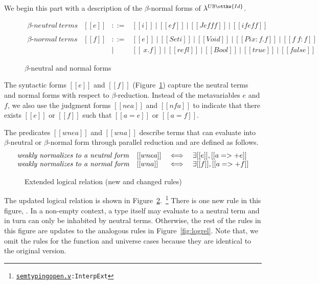 \documentclass[acmsmall,screen=true,
\ifpublic review=false\else,review=true\fi
  ,anonymous=\ifanonymous true\else false\fi]{acmart}
\newcommand{\dotv}[2]{\href{#1}{\texttt{#1}}{\texttt{:#2}}}
\newcommand{\lang}{$\lambda^{U\mathbb{B}\ottkw{Id}}$\xspace}
\newcommand{\scw}[1]{}
\begin{document}
We begin this part with a description of the $\beta$-normal forms
of \lang{}.

\begin{figure}[h]
  \[
    \begin{array}{llcl}
       \beta\text{-}\mathit{neutral\ terms} &
      [[e]] & ::= & [[i]]\ |\ [[e f]]\ |\ [[J e f f f]]\ |\ [[if e f
                    f]] \\ \\
      \beta\text{-}\mathit{normal\ terms} &
      [[f]] & ::= & [[e]]\ |\ [[Set i]]\ |\ [[Void]]\ |\ [[Pi x : f . f]]\
                    |\ [[f ~ f : f]]\\
            & & |   & [[\ x . f]]\ |\ [[refl]]\ |\ [[Bool]]\ |\ [[true]]\ |\ [[false]]
    \end{array}
  \]
  \caption{$\beta$-neutral and normal forms}
  \label{fig:nenf}
\end{figure}

The syntactic forms $[[e]]$ and $[[f]]$ (Figure~\ref{fig:nenf}) capture the
neutral terms and normal forms with respect to $\beta$-reduction\scw{Why not say parallel reduction here? We can be specific and say that that the only reductions available for these terms are identity reductions and cite
\footnote{\dotv{normalform.v}{nf\_refl}} }. Instead of the
metavariables $e$ and $f$, we also
use the judgment forms $[[ne a]]$ and $[[nf a]]$ to indicate that there exists
$[[e]]$ or $[[f]]$ such that $[[a = e]]$ or $[[a = f]]$.

The predicates $[[wne a]]$ and $[[wn
a]]$ describe terms that can evaluate into $\beta$-neutral or
$\beta$-normal form through parallel reduction and are defined as
follows.
\[
\begin{array}{llcl}
\mbox{\emph{weakly normalizes to a neutral form}} & [[wne a]] &\iff& \exists [[e]], [[a =>+ e]] \\
\mbox{\emph{weakly normalizes to a normal form}}  & [[wn a]]  &\iff& \exists [[f]], [[a =>+ f]] \\
\end{array}
\]

\begin{figure}[h]
  \caption{Extended logical relation (new and changed rules) }
  \label{fig:logrelopen}
\end{figure}

The updated logical relation is shown in
Figure~\ref{fig:logrelopen}.~\footnote{\dotv{semtypingopen.v}{InterpExt}}
There is one new rule in this figure, \rref{I-Ne}. In a non-empty context, a
type itself may evaluate to a neutral term and in turn can only be inhabited
by neutral terms.  Otherwise, the rest of the rules in this figure are updates
to the analogous rules in Figure~\ref{fig:logrel}. Note that, we omit the
rules for the function and universe cases because they are identical to the
original version.
\end{document}
